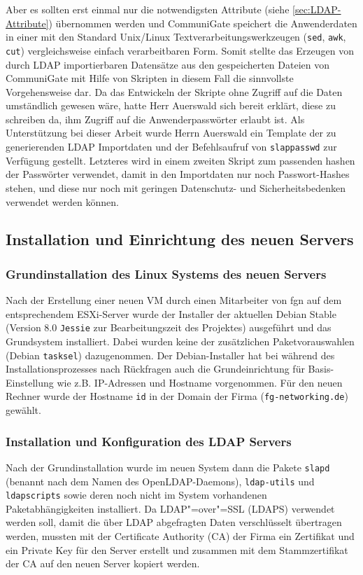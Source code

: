\documentclass[11pt,a4paper,titlepage=firstiscover,headsepline,bibtotoc]{scrartcl} %
\begin{document}
Aber es sollten erst einmal nur die notwendigsten Attribute (siehe \autoref{sec:LDAP-Attribute}) übernommen werden und CommuniGate speichert die Anwenderdaten in einer mit den Standard Unix/Linux Textverarbeitungswerkzeugen (\texttt{sed}, \texttt{awk}, \texttt{cut}) vergleichsweise einfach verarbeitbaren Form. Somit stellte das Erzeugen von durch LDAP importierbaren Datensätze aus den gespeicherten Dateien von CommuniGate mit Hilfe von Skripten in diesem Fall die sinnvollste Vorgehensweise dar. Da das Entwickeln der Skripte ohne Zugriff auf die Daten umständlich gewesen wäre, hatte Herr Auerswald sich bereit erklärt, diese zu schreiben da, ihm Zugriff auf die Anwenderpasswörter erlaubt ist. Als Unterstützung bei dieser Arbeit wurde Herrn Auerswald ein Template der zu generierenden LDAP Importdaten und der Befehlsaufruf von \texttt{slappasswd} zur Verfügung gestellt. Letzteres wird in einem zweiten Skript zum passenden hashen der Passwörter verwendet, damit in den Importdaten nur noch Passwort-Hashes stehen, und diese nur noch mit geringen Datenschutz- und Sicherheitsbedenken verwendet werden können.

\subsection{Installation und Einrichtung des neuen Servers}
\subsubsection{Grundinstallation des Linux Systems des neuen Servers}
Nach der Erstellung einer neuen VM durch einen Mitarbeiter von fgn auf dem entsprechendem ESXi-Server wurde der Installer der aktuellen Debian Stable (Version 8.0 \texttt{Jessie} zur Bearbeitungszeit des Projektes) ausgeführt und das Grundsystem installiert. Dabei wurden keine der zusätzlichen Paketvorauswahlen (Debian \texttt{tasksel}) dazugenommen.  Der Debian-Installer hat bei während des Installationsprozesses nach Rückfragen auch die Grundeinrichtung für Basis-Einstellung wie z.B. IP-Adressen und Hostname vorgenommen. Für den neuen Rechner wurde der Hostname \texttt{id} in der Domain der Firma (\texttt{fg-networking.de}) gewählt.

\subsubsection{Installation und Konfiguration des LDAP Servers}
Nach der Grundinstallation wurde im neuen System dann die Pakete \texttt{slapd} (benannt nach dem Namen des OpenLDAP-Daemons), \texttt{ldap-utils} und \texttt{ldapscripts} sowie deren noch nicht im System vorhandenen Paketabhängigkeiten installiert. Da LDAP"=over"=SSL (LDAPS) verwendet werden soll, damit die über LDAP abgefragten Daten verschlüsselt übertragen werden, mussten mit der Certificate Authority (CA) der Firma ein Zertifikat und ein Private Key für den Server erstellt und zusammen mit dem Stammzertifikat der CA auf den neuen Server kopiert werden.
\end{document}
